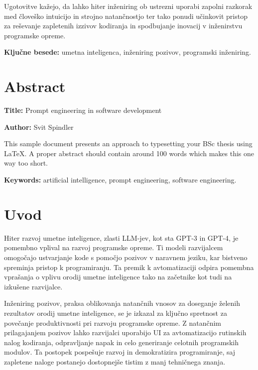 \documentclass[a4paper,12pt,openright]{book}
\newcommand{\ttitleEn}{Prompt engineering in software development}
\newcommand{\tauthor}{Svit Spindler}
\newcommand{\tkeywords}{umetna inteligenca, inženiring pozivov, programski inženiring}
\newcommand{\tkeywordsEn}{artificial intelligence, prompt engineering, software engineering}
\newcommand{\clearemptydoublepage}{\newpage{\pagestyle{empty}\cleardoublepage}}
\begin{document}
Ugotovitve kažejo, da lahko hiter inženiring ob ustrezni uporabi zapolni razkorak med človeško intuicijo in strojno natančnostjo ter tako ponudi učinkovit pristop za reševanje zapletenih izzivov kodiranja in spodbujanje inovacij v inženirstvu programske opreme.

\bigskip

\noindent\textbf{Ključne besede:} \tkeywords.
\clearemptydoublepage

{}
\chapter*{Abstract}

\noindent\textbf{Title:} \ttitleEn
\bigskip

\noindent\textbf{Author:} \tauthor
\bigskip

\noindent This sample document presents an approach to typesetting your BSc thesis using \LaTeX. 
A proper abstract should contain around 100 words which makes this one way too short.
\bigskip

\noindent\textbf{Keywords:} \tkeywordsEn.
\clearemptydoublepage


\chapter{Uvod}

Hiter razvoj umetne inteligence, zlasti LLM-jev, kot sta GPT-3 in GPT-4, je pomembno vplival na razvoj programske opreme. Ti modeli razvijalcem omogočajo ustvarjanje kode s pomočjo pozivov v naravnem jeziku, kar bistveno spreminja pristop k programiranju. Ta premik k avtomatizaciji odpira pomembna vprašanja o vplivu orodij umetne inteligence tako na začetnike kot tudi na izkušene razvijalce.

Inženiring pozivov, praksa oblikovanja natančnih vnosov za doseganje želenih rezultatov orodij umetne inteligence, se je izkazal za ključno spretnost za povečanje produktivnosti pri razvoju programske opreme. Z natančnim prilagajanjem pozivov lahko razvijalci uporabijo UI za avtomatizacijo rutinskih nalog kodiranja, odpravljanje napak in celo generiranje celotnih programskih modulov. Ta postopek pospešuje razvoj in demokratizira programiranje, saj zapletene naloge postanejo dostopnejše tistim z manj tehničnega znanja.
\end{document}
